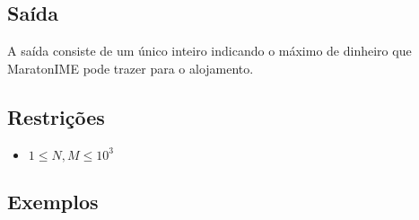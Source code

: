 \subsection*{Saída}

A saída consiste de um único inteiro indicando o máximo de dinheiro que MaratonIME pode trazer para o alojamento.\\

\subsection*{Restrições}
\begin{itemize}
  \item $1 \leq N,M \leq 10^3 $
\end{itemize}

\subsection*{Exemplos}

